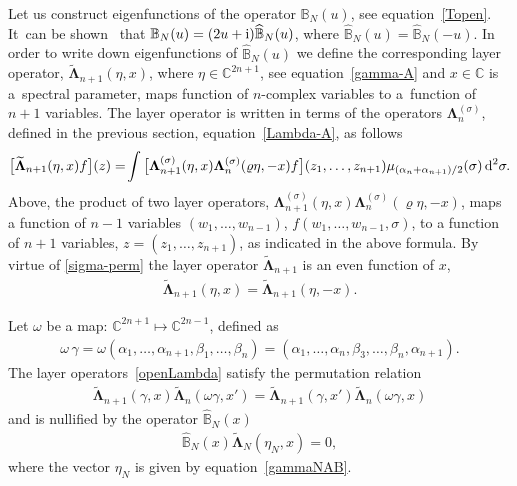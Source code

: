 Let us construct eigenfunctions of the operator $\mathbb B_N(u)$, see equation~\eqref{Topen}. It~can be shown~\cite{Derkachov:2003qb} that $
\mathbb B_N(u)=(2u+{\rm i}) \widehat{\mathbb B}_N(u)$, where $\widehat{\mathbb B}_N(u)=\widehat{\mathbb B}_N(-u)$. In order to write down
eigenfunctions of $\widehat{\mathbb B}_N(u)$ we define the corresponding layer operator, $\widetilde{ \boldsymbol \Lambda}_{n+1}(\eta,x)$,
where $\eta\in \mathbb C^{2n+1}$, see equation~\eqref{gamma-A} and $x\in\mathbb C$ is a~spectral parameter, maps function of $n$-complex variables to a~function of $n+1$ variables.
The layer operator is written in terms of the operators $\boldsymbol \Lambda_n^{(\sigma)}$, defined in the previous section, equation~\eqref{Lambda-A}, as follows
\begin{gather}\label{openLambda}
\big[\widetilde{ \boldsymbol \Lambda}_{n+1}(\eta,x) f\big](z)
=\!
\int \big[\boldsymbol \Lambda^{(\sigma)}_{n+1}(\eta,x)\boldsymbol \Lambda^{(\sigma)}_{n}(\varrho\eta,-x) f\big](z_1,\dots, z_{n+1})
\mu_{{(\alpha_{n}+\alpha_{n+1})}/2}(\sigma)\, {\rm d}^2\sigma .
\end{gather}
Above, the product of two layer operators, $\boldsymbol \Lambda^{(\sigma)}_{n+1}(\eta,x)\boldsymbol \Lambda^{(\sigma)}_{n}(\varrho\eta,-x)
$, maps a function of $n-1$ variables $(w_1,\dots, w_{n-1})$, $f(w_1,\dots, w_{n-1},\sigma)$, to a function of $n+1$ variables, $ z=(z_1,\dots,z_{n+1})$, as indicated in
the above formula. By virtue of \eqref{sigma-perm}
 the layer operator $\widetilde{\boldsymbol \Lambda}_{n+1}$ is an even function of $x$,
\begin{gather*}
\widetilde{ \boldsymbol \Lambda}_{n+1}(\eta,x)= \widetilde{ \boldsymbol \Lambda}_{n+1}(\eta,-x).
\end{gather*}

Let $\omega$ be a map: $\mathbb C^{2n+1}\mapsto \mathbb C^{2n-1}$, defined as
\begin{gather*}
\omega\,\gamma=\omega(\alpha_1,\dots,\alpha_{n+1},\beta_{1},\dots,\beta_n)
=(\alpha_1,\dots,\alpha_n,\beta_{3},\dots,\beta_{n},\alpha_{n+1}).
\end{gather*}
The layer operators~\eqref{openLambda} satisfy the permutation relation~\cite{Derkachov:2003qb}
\begin{gather*}
\widetilde{ \boldsymbol \Lambda}_{n+1}(\gamma,x)\widetilde{ \boldsymbol \Lambda}_{n}(\omega\gamma,x')=
\widetilde{ \boldsymbol \Lambda}_{n+1}(\gamma,x')\widetilde{ \boldsymbol \Lambda}_{n}(\omega\gamma,x)
\end{gather*}
and is nullified by the operator $\widehat{\mathbb B}_N(x)$
\begin{gather}\label{BopenL=0}
\widehat{\mathbb B}_N(x)\widetilde{ \boldsymbol \Lambda}_{N}(\eta_N,x)=0,
\end{gather}
where the vector $\eta_N$ is given by equation~\eqref{gammaNAB}.


